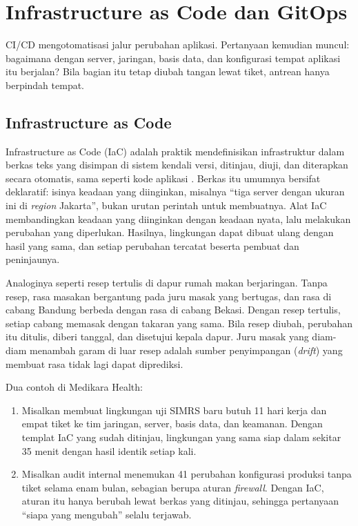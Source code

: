 \section{Infrastructure as Code dan GitOps}
\label{sec:ch13-gitops}

CI/CD mengotomatisasi jalur perubahan aplikasi. Pertanyaan kemudian muncul: bagaimana dengan
server, jaringan, basis data, dan konfigurasi tempat aplikasi itu berjalan? Bila bagian itu tetap
diubah tangan lewat tiket, antrean hanya berpindah tempat.

\subsection{Infrastructure as Code}

Infrastructure as Code (IaC) adalah praktik mendefinisikan infrastruktur dalam berkas teks yang
disimpan di sistem kendali versi, ditinjau, diuji, dan diterapkan secara otomatis, sama seperti
kode aplikasi \cite{c13-morris2025}. Berkas itu umumnya bersifat deklaratif: isinya keadaan yang
diinginkan, misalnya ``tiga server dengan ukuran ini di \textit{region} Jakarta'', bukan urutan
perintah untuk membuatnya. Alat IaC membandingkan keadaan yang diinginkan dengan keadaan nyata,
lalu melakukan perubahan yang diperlukan. Hasilnya, lingkungan dapat dibuat ulang dengan hasil
yang sama, dan setiap perubahan tercatat beserta pembuat dan peninjaunya.

Analoginya seperti resep tertulis di dapur rumah makan berjaringan. Tanpa resep, rasa masakan
bergantung pada juru masak yang bertugas, dan rasa di cabang Bandung berbeda dengan rasa di cabang
Bekasi. Dengan resep tertulis, setiap cabang memasak dengan takaran yang sama. Bila resep diubah,
perubahan itu ditulis, diberi tanggal, dan disetujui kepala dapur. Juru masak yang diam-diam
menambah garam di luar resep adalah sumber penyimpangan (\textit{drift}) yang membuat rasa tidak
lagi dapat diprediksi.

Dua contoh di Medikara Health:
\begin{enumerate}
  \item Misalkan membuat lingkungan uji SIMRS baru butuh 11 hari kerja dan empat tiket ke tim
        jaringan, server, basis data, dan keamanan. Dengan templat IaC yang sudah ditinjau,
        lingkungan yang sama siap dalam sekitar 35 menit dengan hasil identik setiap kali.
  \item Misalkan audit internal menemukan 41 perubahan konfigurasi produksi tanpa tiket selama
        enam bulan, sebagian berupa aturan \textit{firewall}. Dengan IaC, aturan itu hanya berubah
        lewat berkas yang ditinjau, sehingga pertanyaan ``siapa yang mengubah'' selalu terjawab.
\end{enumerate}

